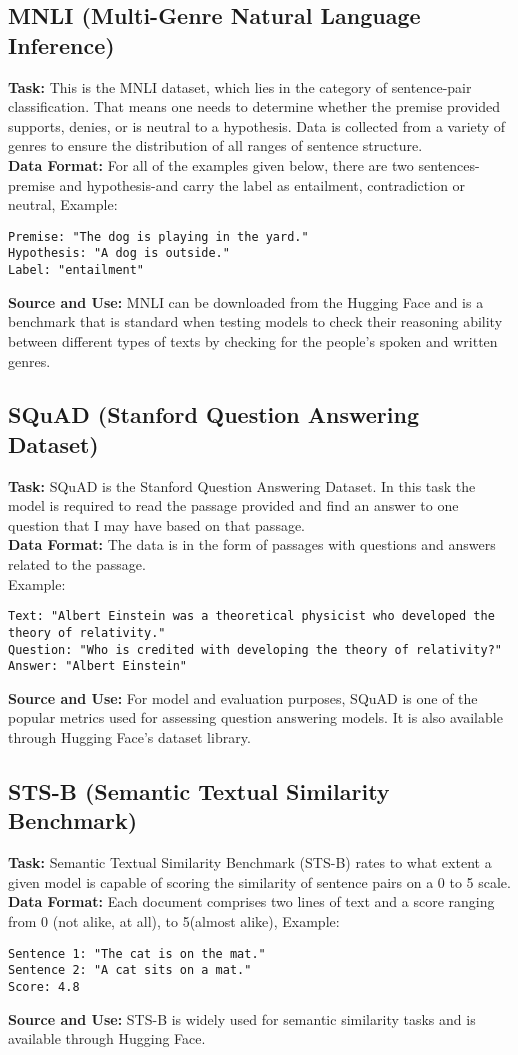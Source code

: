 \documentclass{article}
\begin{document}
\subsection{MNLI (Multi-Genre Natural Language Inference)}
\textbf{Task:} This is the MNLI dataset, which lies in the category of sentence-pair classification. That means one needs to determine whether the premise provided supports, denies, or is neutral to a hypothesis. Data is collected from a variety of genres to ensure the distribution of all ranges of sentence structure.\\
\textbf{Data Format:} For all of the examples given below, there are two sentences-premise and hypothesis-and carry the label as entailment, contradiction or neutral, Example:
\begin{verbatim}
Premise: "The dog is playing in the yard."
Hypothesis: "A dog is outside."
Label: "entailment"
\end{verbatim}
\textbf{Source and Use:} MNLI can be downloaded from the Hugging Face and is a benchmark that is standard when testing models to check their reasoning ability between different types of texts by checking for the people's spoken and written genres.

\subsection{SQuAD (Stanford Question Answering Dataset)}
\textbf{Task:} SQuAD is the Stanford Question Answering Dataset. In this task the model is required to read the passage provided and find an answer to one question that I may have based on that passage.\\
\textbf{Data Format:} The data is in the form of passages with questions and answers related to the passage.\\
Example:

\begin{verbatim}
Text: "Albert Einstein was a theoretical physicist who developed the theory of relativity."
Question: "Who is credited with developing the theory of relativity?"
Answer: "Albert Einstein"
\end{verbatim}
\textbf{Source and Use:} For model and evaluation purposes, SQuAD is one of the popular metrics used for assessing question answering models. It is also available through Hugging Face's dataset library.

\subsection{STS-B (Semantic Textual Similarity Benchmark)}
\textbf{Task:} Semantic Textual Similarity Benchmark (STS-B) rates to what extent a given model is capable of scoring the similarity of sentence pairs on a 0 to 5 scale.\\
\textbf{Data Format:} Each document comprises two lines of text and a score ranging from 0 (not alike, at all), to 5(almost alike), Example:
\begin{verbatim}
Sentence 1: "The cat is on the mat."
Sentence 2: "A cat sits on a mat."
Score: 4.8
\end{verbatim}
\textbf{Source and Use:} STS-B is widely used for semantic similarity tasks and is available through Hugging Face.
\end{document}
